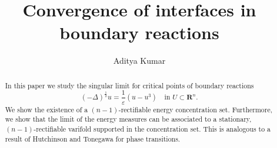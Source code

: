 \documentclass[12pt,reqno]{amsart}
\begin{document}
\title{Convergence of interfaces in boundary reactions}
\author{Aditya Kumar}
\address{Department of Mathematics, Johns Hopkins University, 3400 N. Charles Street, Baltimore, MD 21218 , USA}

\begin{abstract}
In this paper we study the singular limit for critical points of boundary reactions 
\begin{equation*}
    (-\Delta)^{\frac{1}{2}}u = \frac{1}{\varepsilon}(u-u^3) \quad \text{in } U \subset \textbf{R}^n .
\end{equation*}
 We show the existence of a $(n-1)$-rectifiable energy concentration set. Furthermore, we show that the limit of the energy measures can be associated to a stationary, $(n-1)$-rectifiable varifold supported in the concentration set. This is analogous to a result of Hutchinson and Tonegawa for phase transitions.
\end{abstract}



\maketitle








\end{document}

